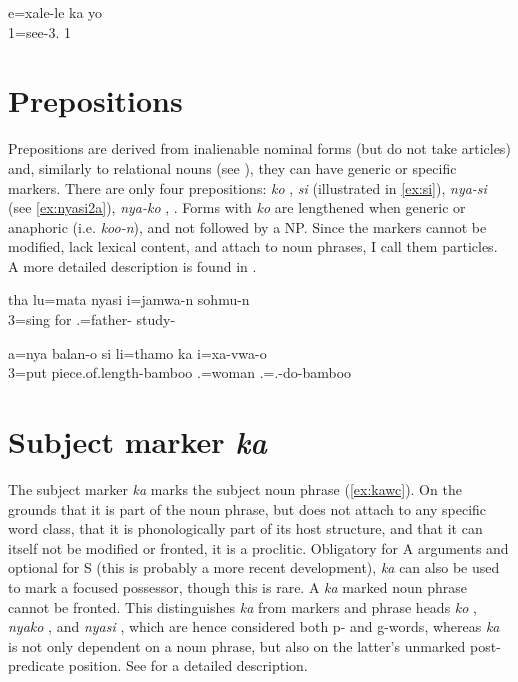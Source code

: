 \ea \label{ex:subject_index}
\gll e=xale-le ka yo\\
 1=see-3.  1\\
\glt {}
\z

\section{Prepositions}
\label{sec:WCPP}

Prepositions are derived from inalienable nominal forms (but do not take articles) and, similarly to relational nouns (see ), they can have generic or specific markers. There are only four prepositions: \textit{ko}  , \textit{si}  (illustrated in \ref{ex:si}), \textit{nya-si}   (see \ref{ex:nyasi2a}), \textit{nya-ko} , . Forms with \textit{ko} are lengthened when generic or anaphoric (i.e. \textit{koo-n}), and not followed by a NP. Since the markers cannot be modified, lack lexical content, and attach to noun phrases, I call them particles. A more detailed description is found in .


\ea\label{ex:nyasi2a}
\gll tha lu=mata nyasi i=jamwa-n sohmu-n\\
  3=sing for .=father- study-\\
\glt {}
\z


\ea\label{ex:si}
\gll a=nya balan-o si li=thamo ka i=xa-vwa-o\\
 3=put piece.of.length-bamboo  .=woman  .=.-do-bamboo\\
\glt {}
\z

\section{Subject marker \textit{ka}}
\label{sec:WC_sbjka}
The subject marker \textit{ka} marks the subject noun phrase (\ref{ex:kawc}). On the grounds that it is part of the noun phrase, but does not attach to any specific word class, that it is phonologically part of its host structure, and that it can itself not be modified or fronted, it is a proclitic. Obligatory for A arguments and optional for S (this is probably a more recent development), \textit{ka} can also be used to mark a focused possessor, though this is rare. A \textit{ka} marked noun phrase cannot be fronted. This distinguishes \textit{ka} from  markers and phrase heads \textit{ko} , \textit{nyako} , and \textit{nyasi} , which are hence considered both p- and g-words, whereas \textit{ka} is not only dependent on a noun phrase, but also on the latter's unmarked post-predicate position. See  for a detailed description.

